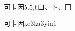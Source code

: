 \begin{entry}{可卡因}{5,5,6}{⼝、⼘、⼞}
  \begin{phonetics}{可卡因}{ke3ka3yin1}
  \end{phonetics}
\end{entry}

